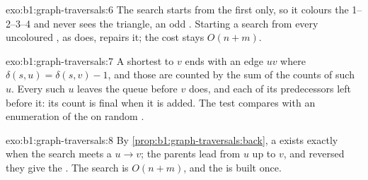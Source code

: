 \begin{solution}{exo:b1:graph-traversals:6}
The search starts from the first  only, so it colours the  1--2--3--4 and never sees the triangle, an odd
. Starting a search from every uncoloured , as  does, repairs it; the cost stays
$O(n + m)$.
\end{solution}

\begin{solution}{exo:b1:graph-traversals:7}
A shortest  to $v$ ends with an edge $u v$ where $\delta(s, u) = \delta(s, v) - 1$, and those  are counted by
the sum of the counts of such $u$. Every such $u$ leaves the queue before $v$ does, and each of its predecessors left
before it: its count is final when it is added. The test compares with an enumeration of the  on random .
\end{solution}

\begin{solution}{exo:b1:graph-traversals:8}
By \cref{prop:b1:graph-traversals:back}, a  exists exactly when the search meets a  $u \to v$; the parents
lead from $u$ up to $v$, and reversed they give the . The search is $O(n + m)$, and the  is built once.
\end{solution}

